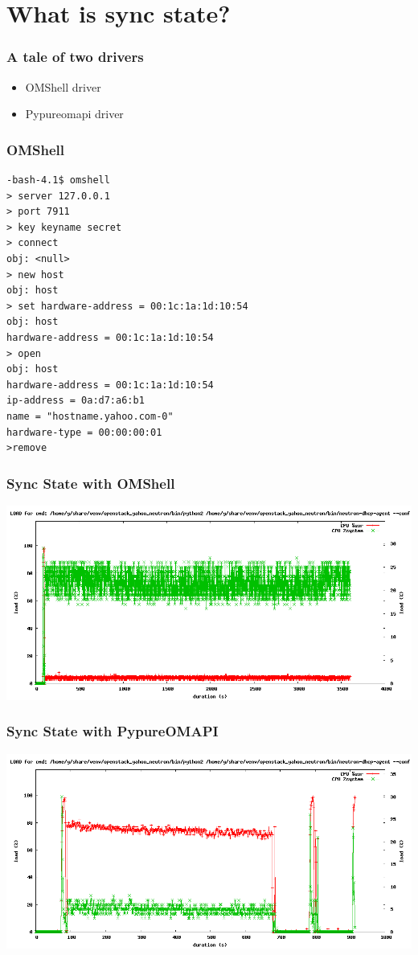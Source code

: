 \documentclass[aspectratio=169,11pt,hyperref={colorlinks=true}]{beamer}
\newcommand\Fontvi{\fontsize{6}{7.2}\selectfont}
\begin{document}
\section{What is sync state?}
\begin{frame}
    \frametitle{A tale of two drivers}
    \begin{itemize}[<+-| alert@+>]
        \item OMShell driver
        \item Pypureomapi driver
    \end{itemize}
\end{frame}

\begin{frame}[fragile]
    \frametitle{OMShell}
    \Fontvi
\begin{verbatim}
-bash-4.1$ omshell
> server 127.0.0.1
> port 7911
> key keyname secret
> connect
obj: <null>
> new host
obj: host
> set hardware-address = 00:1c:1a:1d:10:54  
obj: host
hardware-address = 00:1c:1a:1d:10:54
> open
obj: host
hardware-address = 00:1c:1a:1d:10:54
ip-address = 0a:d7:a6:b1
name = "hostname.yahoo.com-0"
hardware-type = 00:00:00:01
>remove
    \end{verbatim}
\end{frame}

\begin{frame}
    \frametitle{Sync State with OMShell}
     \begin{center}
         \includegraphics[scale=0.35]{logos/omshell.png}
    \end{center}
\end{frame}


\begin{frame}
    \frametitle{Sync State with PypureOMAPI}
     \begin{center}
         \includegraphics[scale=0.35]{logos/pypureomapi.png}
    \end{center}
\end{frame}
\end{document}
